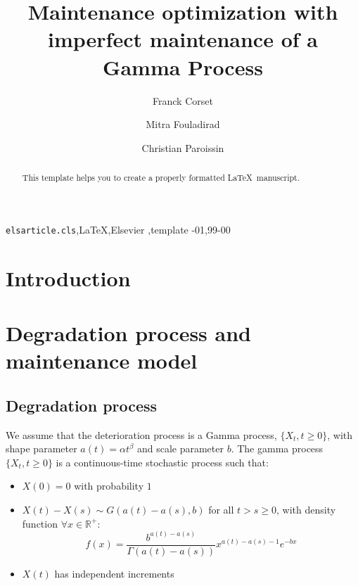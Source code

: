 \documentclass[review]{elsarticle}
\begin{document}
\begin{frontmatter}

\title{Maintenance optimization with imperfect maintenance of a Gamma Process}









\author[adressFC]{Franck Corset}


\author[adressMF]{Mitra Fouladirad}

\author[adressCP]{Christian Paroissin}





\address[adressFC]{LJK - UGA}
\address[adressMF]{UTT}
\address[adressCP]{UPPA}

\begin{abstract}
This template helps you to create a properly formatted \LaTeX\ manuscript.
\end{abstract}

\begin{keyword}
\texttt{elsarticle.cls}\sep \LaTeX\sep Elsevier \sep template
-01\sep  99-00
\end{keyword}

\end{frontmatter}

\linenumbers

\section{Introduction}

\section{Degradation process and maintenance model}
\subsection{Degradation process}
We assume that the deterioration process is a Gamma process, $\{X_t,t\geq 0\}$, with shape parameter $a(t)=\alpha t^\beta$ and scale parameter $b$.
The gamma process $\{X_t,t\geq 0\}$ is a continuous-time stochastic process such that:
\begin{itemize}
	\item $X(0) = 0$ with probability $1$
	\item $X(t)-X(s)\sim G(a(t)-a(s),b)$ for all $t>s\geq0$, with density function $\forall x\in \mathbb R^+$:
	$$
f(x) = \dfrac{b^{a(t)-a(s)}}{\Gamma(a(t)-a(s))}x^{a(t)-a(s)-1}e^{-bx}
	$$
	\item $X(t)$ has independent increments 
\end{itemize}
\end{document}
